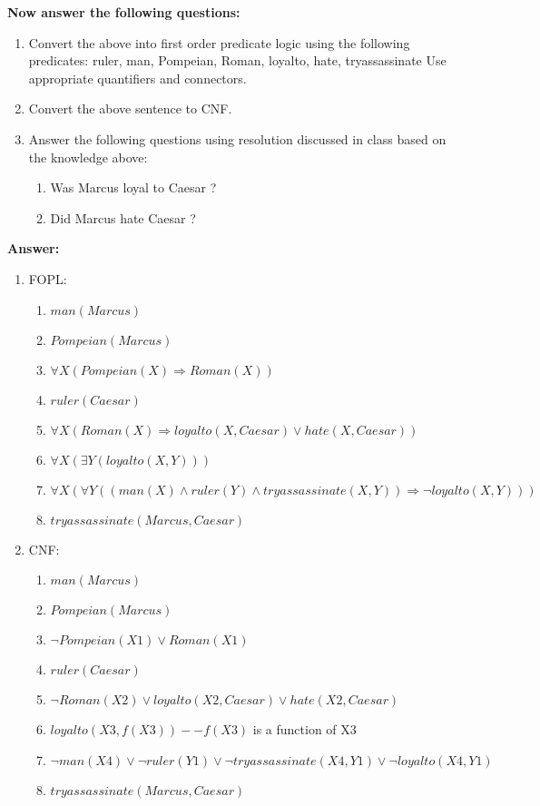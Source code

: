 \documentclass{article}%
\begin{document}
\begin{enumerate}
\textbf{Now answer the following questions:}

	\begin{enumerate}
	\item Convert the above into first order predicate logic using the following predicates: ruler, man, Pompeian, Roman, loyalto, hate, tryassassinate Use appropriate quantifiers and connectors.
	\item Convert the above sentence to CNF.
	\item Answer the following questions using resolution discussed in class based on the knowledge above:
		\begin{enumerate}
		\item Was Marcus loyal to Caesar ?
		\item Did Marcus hate Caesar ?
		\end{enumerate}

	\end{enumerate}
	
	\textbf{Answer:}\\
	\begin{enumerate}
	\item FOPL:
		\begin{enumerate}
		\item $ man(Marcus) $
		\item $ Pompeian(Marcus) $
		\item $ \forall X (Pompeian(X) \Rightarrow Roman(X)) $
		\item $ ruler(Caesar) $
		\item $ \forall X (Roman(X) \Rightarrow loyalto(X, Caesar) \vee hate(X, Caesar)) $
		\item $ \forall X (\exists Y (loyalto(X, Y))) $
		\item $ \forall X (\forall Y ( (man(X) \wedge ruler(Y) \wedge tryassassinate(X,Y) ) \Rightarrow \neg loyalto(X,Y))) $
		\item $ tryassassinate(Marcus, Caesar) $
		\end{enumerate}
	\item CNF: 
		\begin{enumerate}
		\item $ man(Marcus) $
		\item $ Pompeian(Marcus) $
		\item $ \neg Pompeian(X1) \vee Roman(X1) $
		\item $ ruler(Caesar) $
		\item $ \neg Roman(X2) \vee loyalto(X2, Caesar) \vee hate(X2, Caesar) $
		\item $ loyalto(X3, f(X3)) -- f(X3)$ is a function of X3 
		\item $ \neg man(X4) \vee \neg ruler(Y1) \vee \neg tryassassinate(X4,Y1)  \vee \neg loyalto(X4,Y1) $
		\item $ tryassassinate(Marcus, Caesar) $
		\end{enumerate}
		

\end{enumerate}
\end{enumerate}
\end{document}
